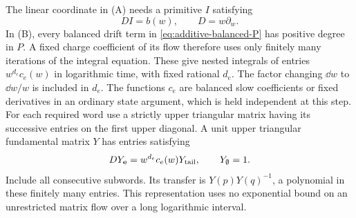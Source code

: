 The linear coordinate in (A) needs a primitive $I$ satisfying
\begin{equation}\label{eq:additive-I}
 D I=b(w),\qquad D=w\partial_w.
\end{equation}
In (B), every balanced drift term in
\eqref{eq:additive-balanced-P} has positive degree in $P$.  A fixed
charge coefficient of its flow therefore uses only finitely many
iterations of the integral equation.  These give nested integrals of
entries $w^{d_e}c_e(w)$ in logarithmic time, with fixed rational $d_e$.
The factor changing $\dd w$ to $\dd w/w$ is included in $d_e$.
The functions $c_e$ are balanced slow coefficients or fixed derivatives
in an ordinary state argument, which is held independent at this step.
For each required word use a strictly upper triangular matrix having
its successive entries on the first upper diagonal.  A unit upper
triangular fundamental matrix $Y$ has entries satisfying
\begin{equation}\label{eq:additive-word}
 D Y_{\mathbf e}=w^{d_e}c_e(w)Y_{\rm tail},\qquad
 Y_\emptyset=1.
\end{equation}
Include all consecutive subwords.  Its transfer is $Y(p)Y(q)^{-1}$,
a polynomial in these finitely many entries.  This representation uses
no exponential bound on an unrestricted matrix flow over a long
logarithmic interval.

